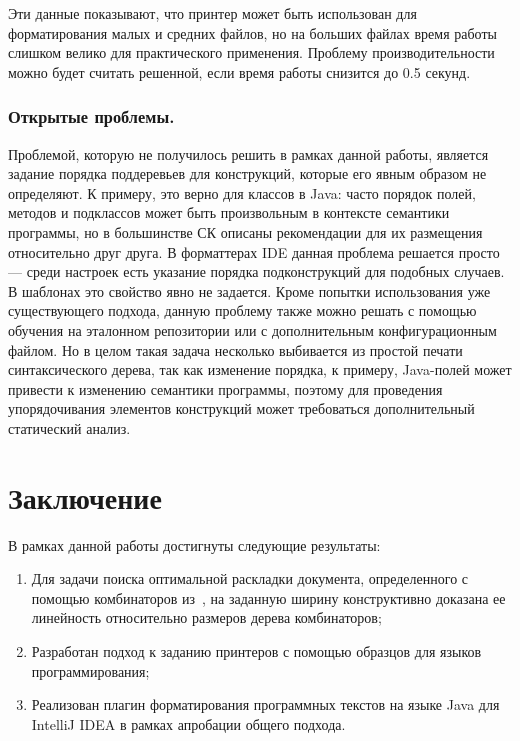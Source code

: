 Эти данные показывают, что принтер может быть использован для
форматирования малых и средних файлов, но на больших файлах время
работы слишком велико для практического применения. Проблему производительности
можно будет считать решенной, если время работы снизится до 0.5 секунд.

\subsubsection{Открытые проблемы.}

Проблемой, которую не получилось решить в рамках данной работы,
является задание порядка поддеревьев для конструкций, которые
его явным образом не определяют. К примеру, это верно для классов в Java:
часто порядок полей, методов и подклассов может быть произвольным в контексте
семантики программы, но в большинстве СК описаны рекомендации для их размещения
относительно друг друга. В форматтерах IDE данная проблема решается просто ---
среди настроек есть указание порядка подконструкций для подобных случаев.
В шаблонах это свойство явно не задается. Кроме попытки использования
уже существующего подхода, данную проблему также можно 
решать с помощью обучения на эталонном репозитории или с дополнительным
конфигурационным файлом. Но в целом такая задача несколько выбивается из
простой печати синтаксического дерева, так как изменение порядка, к примеру,
Java-полей может привести к изменению семантики программы, поэтому для проведения
упорядочивания элементов конструкций может требоваться дополнительный статический
анализ.

\section*{Заключение}


В рамках данной работы достигнуты следующие результаты:
\begin{enumerate}
\item Для задачи поиска оптимальной раскладки документа,
определенного с помощью комбинаторов из~\cite{swierstra}, на заданную ширину
конструктивно доказана ее линейность относительно размеров дерева комбинаторов;
\item Разработан подход к заданию принтеров с помощью образцов для языков программирования;
\item Реализован плагин форматирования программных текстов на языке Java для IntelliJ IDEA
в рамках апробации общего подхода.
\end{enumerate}


